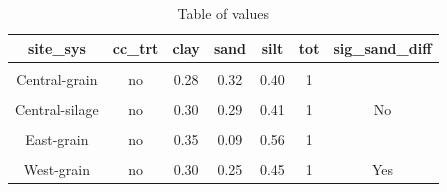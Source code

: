 \documentclass[
]{article}
\begin{document}
\begin{table}[H]

\caption{\label{tab:texture2}Table of values}
\centering
\begin{tabular}[t]{ccccccc}
\toprule
site\_sys & cc\_trt & clay & sand & silt & tot & sig\_sand\_diff\\
\midrule
\cellcolor{gray!6}{} & \cellcolor{gray!6}{cc} & \cellcolor{gray!6}{0.28} & \cellcolor{gray!6}{0.32} & \cellcolor{gray!6}{0.40} & \cellcolor{gray!6}{1} & \cellcolor{gray!6}{}\\

\multirow{-2}{*}{\centering\arraybackslash Central-grain} & no & 0.28 & 0.32 & 0.40 & 1 & \\

\cellcolor{gray!6}{} & \cellcolor{gray!6}{cc} & \cellcolor{gray!6}{0.29} & \cellcolor{gray!6}{0.30} & \cellcolor{gray!6}{0.41} & \cellcolor{gray!6}{1} & \cellcolor{gray!6}{}\\

\multirow{-2}{*}{\centering\arraybackslash Central-silage} & no & 0.30 & 0.29 & 0.41 & 1 & \multirow{-4}{*}{\centering\arraybackslash No}\\
\cmidrule{1-7}
\cellcolor{gray!6}{} & \cellcolor{gray!6}{cc} & \cellcolor{gray!6}{0.32} & \cellcolor{gray!6}{0.12} & \cellcolor{gray!6}{0.56} & \cellcolor{gray!6}{1} & \cellcolor{gray!6}{}\\

\multirow{-2}{*}{\centering\arraybackslash East-grain} & no & 0.35 & 0.09 & 0.56 & 1 & \\

\cellcolor{gray!6}{} & \cellcolor{gray!6}{cc} & \cellcolor{gray!6}{0.27} & \cellcolor{gray!6}{0.31} & \cellcolor{gray!6}{0.42} & \cellcolor{gray!6}{1} & \cellcolor{gray!6}{}\\

\multirow{-2}{*}{\centering\arraybackslash West-grain} & no & 0.30 & 0.25 & 0.45 & 1 & \multirow{-4}{*}{\centering\arraybackslash Yes}\\
\bottomrule
\end{tabular}
\end{table}
\end{document}
